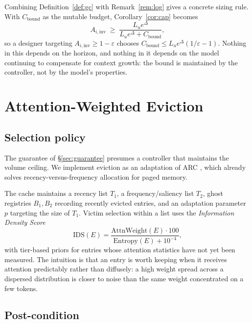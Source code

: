\documentclass[11pt,a4paper]{article}
\theoremstyle{plain}
\theoremstyle{definition}
\theoremstyle{remark}
\newcommand{\Ainv}{A_{i,\mathrm{inv}}}
\begin{document}
Combining Definition~\ref{def:gc} with Remark~\ref{rem:log} gives a concrete
sizing rule. With $C_{\mathrm{bound}}$ as the mutable budget,
Corollary~\ref{cor:cap} becomes
\begin{equation}
  \Ainv \;\ge\; \frac{L_u e^{\Delta}}{L_u e^{\Delta} + C_{\mathrm{bound}}},
\end{equation}
so a designer targeting $\Ainv \ge 1-\varepsilon$ chooses
$C_{\mathrm{bound}} \le L_u e^{\Delta}(1/\varepsilon - 1)$. Nothing in this
depends on the horizon, and nothing in it depends on the model continuing to
compensate for context growth: the bound is maintained by the controller, not by
the model's properties.

\section{Attention-Weighted Eviction}
\label{sec:awe}

\subsection{Selection policy}

The guarantee of \S\ref{sec:guarantee} presumes a controller that maintains the
volume ceiling. We implement eviction as an adaptation of ARC
\cite{megiddo2003arc}, which already solves recency-versus-frequency allocation
for paged memory.

The cache maintains a recency list $T_1$, a frequency/saliency list $T_2$, ghost
registries $B_1, B_2$ recording recently evicted entries, and an adaptation
parameter $p$ targeting the size of $T_1$. Victim selection within a list uses
the \emph{Information Density Score}
\begin{equation}
  \mathrm{IDS}(E)
  = \frac{\mathrm{AttnWeight}(E)\cdot 100}{\mathrm{Entropy}(E) + 10^{-4}},
  \label{eq:ids}
\end{equation}
with tier-based priors for entries whose attention statistics have not yet been
measured. The intuition is that an entry is worth keeping when it receives
attention predictably rather than diffusely: a high weight spread across a
dispersed distribution is closer to noise than the same weight concentrated on a
few tokens.

\subsection{Post-condition}
\end{document}
